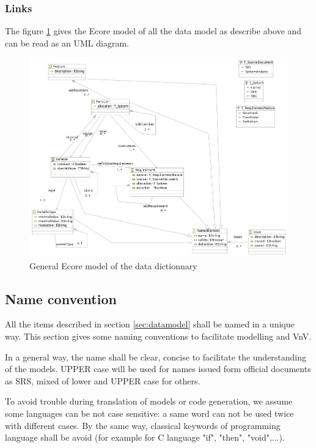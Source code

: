 \subsubsection{Links}


The figure \ref{fig:links} gives the Ecore model of all the data model as describe above and can be read as an UML diagram.

\begin{figure}[ht]
  \centering
  \includegraphics[width=\textwidth]{DataModel/datadictionary.png}
  \caption{General Ecore model of the data dictionnary}
  \label{fig:links}
\end{figure}

\subsection{Name convention}
\label{sec:naming}


All the items described in section \ref{sec:datamodel} shall be named in a unique way. 
This section gives some naming conventions to facilitate modelling and VnV.

In a general way, the name shall be clear, concise to facilitate the understanding of the models. UPPER case will be used for names issued form official documents as SRS, mixed of lower and UPPER case for others.

To avoid trouble during translation of models or code generation, we assume some languages can be not case sensitive: a same word can not be used twice with different cases. By the same way, classical keywords of programming language shall be avoid (for example for C language "if", "then", "void",...).




